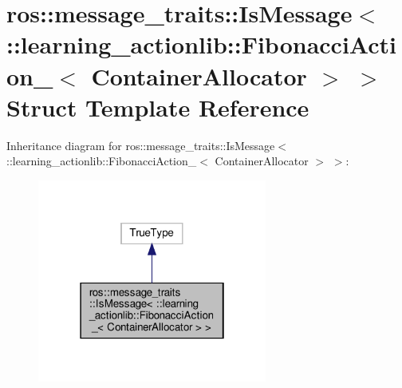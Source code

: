 \hypertarget{structros_1_1message__traits_1_1IsMessage_3_01_1_1learning__actionlib_1_1FibonacciAction___3_01ContainerAllocator_01_4_01_4}{}\section{ros\+:\+:message\+\_\+traits\+:\+:Is\+Message$<$ \+:\+:learning\+\_\+actionlib\+:\+:Fibonacci\+Action\+\_\+$<$ Container\+Allocator $>$ $>$ Struct Template Reference}
\label{structros_1_1message__traits_1_1IsMessage_3_01_1_1learning__actionlib_1_1FibonacciAction___3_01ContainerAllocator_01_4_01_4}


Inheritance diagram for ros\+:\+:message\+\_\+traits\+:\+:Is\+Message$<$ \+:\+:learning\+\_\+actionlib\+:\+:Fibonacci\+Action\+\_\+$<$ Container\+Allocator $>$ $>$\+:
\nopagebreak
\begin{figure}[H]
\begin{center}
\leavevmode
\includegraphics[width=214pt]{structros_1_1message__traits_1_1IsMessage_3_01_1_1learning__actionlib_1_1FibonacciAction___3_01C6364658e508d1a4a275b8249550f7bb8}
\end{center}
\end{figure}


